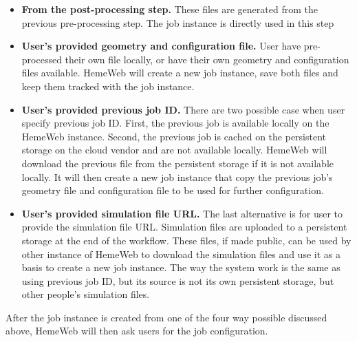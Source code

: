 \begin{itemize}
    \item \textbf{From the post-processing step.}
    	These files are generated from the previous pre-processing step. The job instance is directly used in this step
    
    \item \textbf{User's provided geometry and configuration file.}
    	User have pre-processed their own file locally, or have their own geometry and configuration files available. HemeWeb will create a new job instance, save both files and keep them tracked with the job instance.
	
    \item \textbf{User's provided previous job ID.}
    	There are two possible case when user specify previous job ID. First, the previous job is available locally on the HemeWeb instance. Second, the previous job is cached on the persistent storage on the cloud vendor and are not available locally. HemeWeb will download the previous file from the persistent storage if it is not available locally. It will then create a new job instance that copy the previous job's geometry file and configuration file to be used for further configuration.
    
    \item \textbf{User's provided simulation file URL.}
    	The last alternative is for user to provide the simulation file URL. Simulation files are uploaded to a persistent storage at the end of the workflow. These files, if made public, can be used by other instance of HemeWeb to download the simulation files and use it as a basis to create a new job instance. The way the system work is the same as using previous job ID, but its source is not its own persistent storage, but other people's simulation files.

\end{itemize}


After the job instance is created from one of the four way possible discussed above, HemeWeb will then ask users for the job configuration. 

\vspace{1cm}

